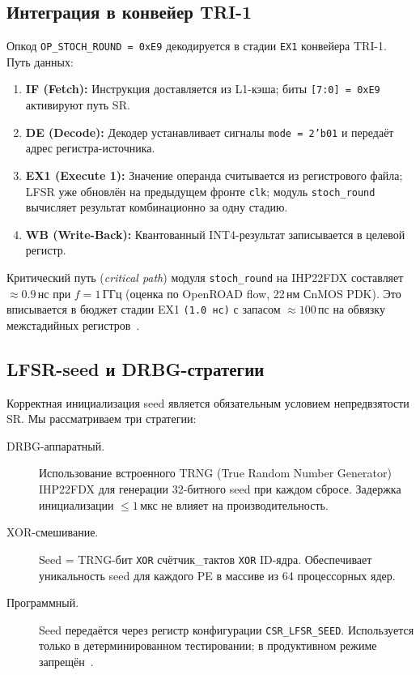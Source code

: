 \subsection{Интеграция в конвейер TRI-1}
\label{ssec:glava88-pipeline}

Опкод \texttt{OP\_STOCH\_ROUND = 0xE9} декодируется в стадии
\texttt{EX1} конвейера TRI-1.  Путь данных:

\begin{enumerate}
  \item \textbf{IF (Fetch):} Инструкция доставляется из L1-кэша;
        биты \texttt{[7:0] = 0xE9} активируют путь SR.
  \item \textbf{DE (Decode):} Декодер устанавливает сигналы
        \texttt{mode = 2'b01} и передаёт адрес регистра-источника.
  \item \textbf{EX1 (Execute 1):} Значение операнда считывается
        из регистрового файла; LFSR уже обновлён на предыдущем
        фронте \texttt{clk}; модуль \texttt{stoch\_round}
        вычисляет результат комбинационно за одну стадию.
  \item \textbf{WB (Write-Back):} Квантованный INT4-результат
        записывается в целевой регистр.
\end{enumerate}

Критический путь (\textit{critical path}) модуля \texttt{stoch\_round}
на IHP22FDX составляет $\approx 0{.}9\,\text{нс}$ при $f = 1\,\text{ГГц}$
(оценка по OpenROAD flow, 22\,нм СnMOS PDK).  Это вписывается
в бюджет стадии EX1 \texttt{(1.0\,нс)} с запасом $\approx 100\,\text{пс}$
на обвязку межстадийных регистров~\cite{Weste-Harris-CMOS4}.

\subsection{LFSR-seed и DRBG-стратегии}
\label{ssec:glava88-seed}

Корректная инициализация seed является обязательным условием
непредвзятости SR.  Мы рассматриваем три стратегии:

\begin{description}
  \item[DRBG-аппаратный.] Использование встроенного TRNG
        (True Random Number Generator) IHP22FDX для генерации
        32-битного seed при каждом сбросе.  Задержка инициализации
        $\leq 1\,\text{мкс}$ не влияет на производительность.
  \item[XOR-смешивание.] Seed = TRNG-бит \texttt{XOR} счётчик\_тактов \texttt{XOR}
        ID-ядра.  Обеспечивает уникальность seed для каждого
        PE в массиве из 64 процессорных ядер.
  \item[Программный.] Seed передаётся через регистр конфигурации
        \texttt{CSR\_LFSR\_SEED}.  Используется только в детерминированном
        тестировании; в продуктивном режиме запрещён~\cite{micikevicius2017mixed}.
\end{description}

